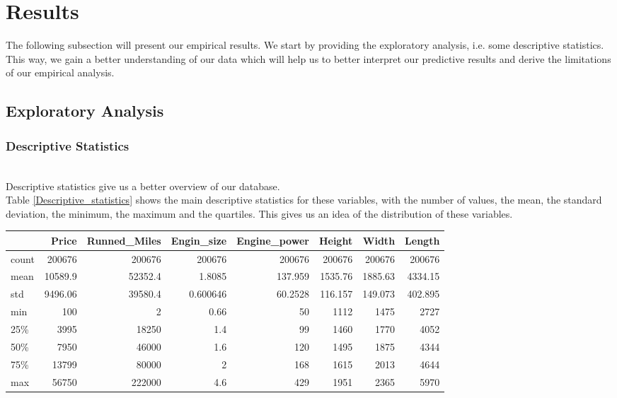 \documentclass[12pt]{article}
\begin{document}
\section{Results}
The following subsection will present our empirical results. We start by providing the exploratory analysis, i.e. some descriptive statistics. This way, we gain a better understanding of our data which will help us to better interpret our predictive results and derive the limitations of our empirical analysis.

\subsection{Exploratory Analysis}
\subsubsection{Descriptive Statistics}
~~\\
\noindent Descriptive statistics give us a better overview of our database.\\

\noindent Table \ref{Descriptive_statistics} shows the main descriptive statistics for these variables, with the number of values, the mean, the standard deviation, the minimum, the maximum and the quartiles. This gives us an idea of the distribution of these variables.\\


\begin{table}[h]
    \centering
    \begin{tabular}{lrrrrrrr}
    \toprule
           & Price & Runned\_Miles & Engin\_size & Engine\_power & Height & Width & Length \\
    \midrule
     count & 200676 & 200676 & 200676 & 200676 & 200676 & 200676 & 200676 \\
     mean & 10589.9 & 52352.4 & 1.8085 & 137.959 & 1535.76 & 1885.63 & 4334.15 \\
     std & 9496.06 & 39580.4 & 0.600646 & 60.2528 & 116.157 & 149.073 & 402.895 \\
     min & 100 & 2 & 0.66 & 50 & 1112 & 1475 & 2727 \\
     25\% & 3995 & 18250 & 1.4 & 99 & 1460 & 1770 & 4052 \\
     50\% & 7950 & 46000 & 1.6 & 120 & 1495 & 1875 & 4344 \\
     75\% & 13799 & 80000 & 2 & 168 & 1615 & 2013 & 4644 \\
     max & 56750 & 222000 & 4.6 & 429 & 1951 & 2365 & 5970 \\
    \bottomrule
    \end{tabular}
\end{table}
\end{document}
